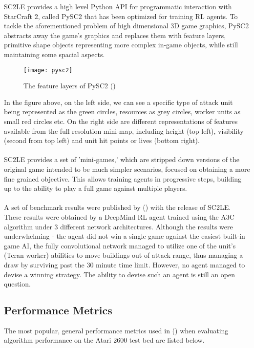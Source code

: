 SC2LE provides a high level Python API for programmatic interaction with StarCraft 2, called PySC2 that has been optimized for training RL agents. To tackle the aforementioned problem of high dimensional 3D game graphics, PySC2 abstracts away the game's graphics and replaces them with feature layers, primitive shape objects representing more complex in-game objects, while still maintaining some spacial aspects.

\begin{figure}[H]
    \centering
    \texttt{[image: pysc2]}
    \caption{The feature layers of PySC2 (\citet{starcraft})}
\end{figure}

In the figure above, on the left side, we can see a specific type of attack unit being represented as the green circles, resources as grey circles, worker units as small red circles etc. On the right side are different representations of features available from the full resolution mini-map, including height (top left), visibility (second from top left) and unit hit points or lives (bottom right). \paragraph{}

SC2LE provides a set of 'mini-games,' which are stripped down versions of the original game intended to be much simpler scenarios, focused on obtaining a more fine grained objective. This allows training agents in progressive steps, building up to the ability to play a full game against multiple players. \paragraph{}

A set of benchmark results were published by (\citet{starcraft}) with the release of SC2LE. These results were obtained by a DeepMind RL agent trained using the A3C algorithm under 3 different network architectures. Although the results were underwhelming - the agent did not win a single game against the easiest built-in game AI, the fully convolutional network managed to utilize one of the unit's (Teran worker) abilities to move buildings out of attack range, thus managing a draw by surviving past the 30 minute time limit. However, no agent managed to devise a winning strategy. The ability to devise such an agent is still an open question.

\subsection{Performance Metrics} \label{subsec:metrics}
The most popular, general performance metrics used in (\citet{doubleq,dueling,deepmind1,human,a3c}) when evaluating algorithm performance on the Atari 2600 test bed are listed below.

